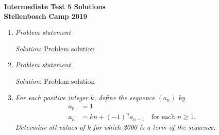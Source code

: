 \documentclass{article}
\begin{document}
\begin{center}
  \textbf{\Large Intermediate Test 5 Solutions}
  \\ \vspace{1em}
  \textbf{\large Stellenbosch Camp 2019}
\end{center}


\begin{enumerate}[1.]

\item %
\textit{Problem statement}

\textit{Solution}: Problem solution

\item %
\textit{Problem statement}

\textit{Solution}: Problem solution

\item %
\textit{For each positive integer $k$, define the sequence $(a_{n})$ by
	\begin{align*}
	a_{0} &= 1 \\
	a_{n} &= kn + (-1)^{n}a_{n-1} \quad \text{for each } n \geq 1.
	\end{align*}
	Determine all values of $k$ for which 2000 is a term of the sequence.}


\end{enumerate}
\end{document}
